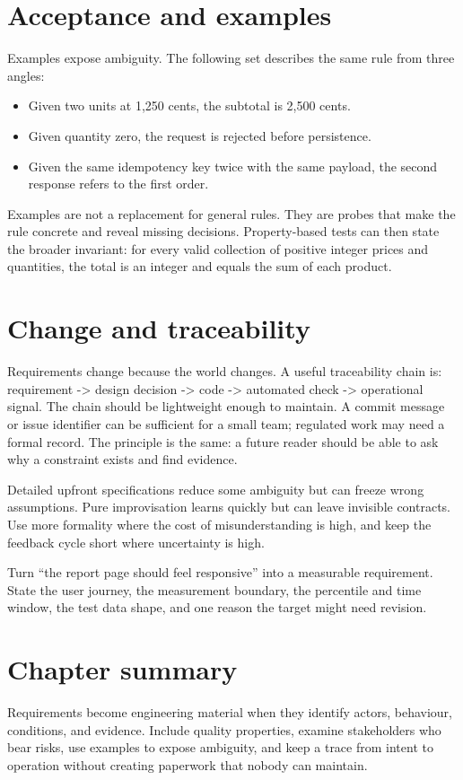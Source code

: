 \section{Acceptance and examples}
Examples expose ambiguity. The following set describes the same rule from three
angles:

\begin{itemize}
  \item Given two units at 1,250 cents, the subtotal is 2,500 cents.
  \item Given quantity zero, the request is rejected before persistence.
  \item Given the same idempotency key twice with the same payload, the second
        response refers to the first order.
\end{itemize}

Examples are not a replacement for general rules. They are probes that make the
rule concrete and reveal missing decisions. Property-based tests can then state
the broader invariant: for every valid collection of positive integer prices and
quantities, the total is an integer and equals the sum of each product.

\section{Change and traceability}
Requirements change because the world changes. A useful traceability chain is:
requirement -> design decision -> code -> automated check -> operational signal.
The chain should be lightweight enough to maintain. A commit message or issue
identifier can be sufficient for a small team; regulated work may need a formal
record. The principle is the same: a future reader should be able to ask why a
constraint exists and find evidence.

\begin{tradeoffs}
Detailed upfront specifications reduce some ambiguity but can freeze wrong
assumptions. Pure improvisation learns quickly but can leave invisible contracts.
Use more formality where the cost of misunderstanding is high, and keep the
feedback cycle short where uncertainty is high.
\end{tradeoffs}

\begin{exercise}
Turn “the report page should feel responsive” into a measurable requirement.
State the user journey, the measurement boundary, the percentile and time window,
the test data shape, and one reason the target might need revision.
\end{exercise}

\section{Chapter summary}
Requirements become engineering material when they identify actors, behaviour,
conditions, and evidence. Include quality properties, examine stakeholders who
bear risks, use examples to expose ambiguity, and keep a trace from intent to
operation without creating paperwork that nobody can maintain.
